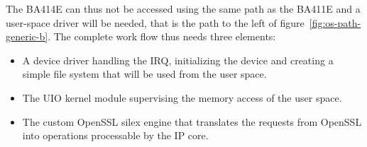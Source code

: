 \noindent The BA414E can thus not be accessed using the same path as the BA411E and a user-space driver will be needed, that is the path to the left of figure~\ref{fig:os-path-generic-b}.
The complete work flow thus needs three elements:
\begin{itemize}
	\item A device driver handling the IRQ, initializing the device and creating a simple file system that will be used from the user space.
	\item The UIO kernel module supervising the memory access of the user space.
	\item The custom OpenSSL silex engine that translates the requests from OpenSSL into operations processable by the IP core.
\end{itemize}
